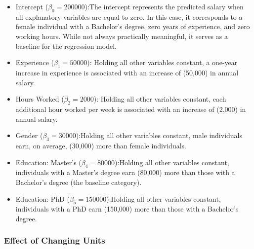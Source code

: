 \documentclass[10pt,a4paper]{article}
\begin{document}
	\begin{itemize}
		\item Intercept ($\beta_0 = 200000$):The intercept represents the predicted salary when all explanatory variables are equal to zero. In this case, it corresponds to a female individual with a Bachelor's degree, zero years of experience, and zero working hours. While not always practically meaningful, it serves as a baseline for the regression model.

		\item Experience ($\beta_1 = 50000$): Holding all other variables constant, a one-year increase in experience is associated with an increase of (\text{}50{,}000) in annual salary.

		\item Hours Worked ($\beta_2 = 2000$): Holding all other variables constant, each additional hour worked per week is associated with an increase of (\text{}2{,}000) in annual salary.

		\item Gender ($\beta_3 = 30000$):Holding all other variables constant, male individuals earn, on average, (\text{}30{,}000) more than female individuals.

		\item Education: Master's ($\beta_4 = 80000$):Holding all other variables constant, individuals with a Master's degree earn (\text{}80{,}000) more than those with a Bachelor's degree (the baseline category).

		\item Education: PhD ($\beta_5 = 150000$):Holding all other variables constant, individuals with a PhD earn (\text{}150{,}000) more than those with a Bachelor's degree.

	\end{itemize}

	\subsubsection{Effect of Changing Units}
\end{document}
